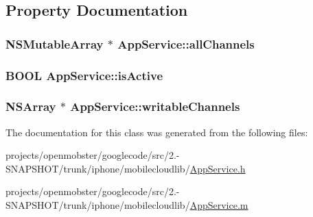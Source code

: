 \subsection{\-Property \-Documentation}
\hypertarget{interface_app_service_ab72e2a3fbfd51e894cd1784db66f3cc8}{
\subsubsection[{all\-Channels}]{\setlength{\rightskip}{0pt plus 5cm}\-N\-S\-Mutable\-Array $\ast$ \-App\-Service\-::all\-Channels}}
\label{interface_app_service_ab72e2a3fbfd51e894cd1784db66f3cc8}
\hypertarget{interface_app_service_ab920054a22c43f1d93155618f4fce0cf}{
\subsubsection[{is\-Active}]{\setlength{\rightskip}{0pt plus 5cm}\-B\-O\-O\-L \-App\-Service\-::is\-Active}}
\label{interface_app_service_ab920054a22c43f1d93155618f4fce0cf}
\hypertarget{interface_app_service_a3c6ebf6a086faf3a74b8ada51d594a50}{
\subsubsection[{writable\-Channels}]{\setlength{\rightskip}{0pt plus 5cm}\-N\-S\-Array $\ast$ \-App\-Service\-::writable\-Channels}}
\label{interface_app_service_a3c6ebf6a086faf3a74b8ada51d594a50}


\-The documentation for this class was generated from the following files\-:\begin{DoxyCompactItemize}
\item 
projects/openmobster/googlecode/src/2.-\/\-S\-N\-A\-P\-S\-H\-O\-T/trunk/iphone/mobilecloudlib/\hyperlink{_app_service_8h}{\-App\-Service.\-h}\item 
projects/openmobster/googlecode/src/2.-\/\-S\-N\-A\-P\-S\-H\-O\-T/trunk/iphone/mobilecloudlib/\hyperlink{_app_service_8m}{\-App\-Service.\-m}\end{DoxyCompactItemize}

